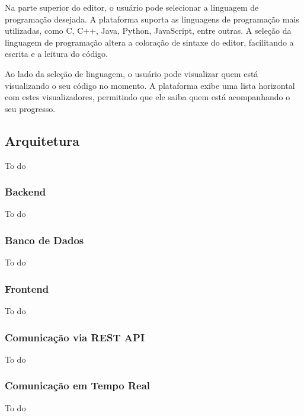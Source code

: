 
Na parte superior do editor, o usuário pode selecionar a linguagem de programação desejada. A plataforma suporta as linguagens de programação mais utilizadas, como C, C++, Java, Python, JavaScript, entre outras. A seleção da linguagem de programação altera a coloração de sintaxe do editor, facilitando a escrita e a leitura do código.

Ao lado da seleção de linguagem, o usuário pode visualizar quem está visualizando o seu código no momento. A plataforma exibe uma lista horizontal com estes visualizadores, permitindo que ele saiba quem está acompanhando o seu progresso.


\subsection{Arquitetura}

To do

\subsubsection{Backend}

To do

\subsubsection{Banco de Dados}

To do 


\subsubsection{Frontend}

To do

\subsubsection{Comunicação via REST API}

To do

\subsubsection{Comunicação em Tempo Real}

To do
